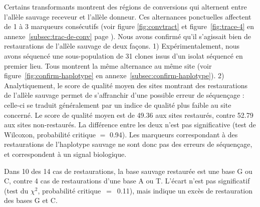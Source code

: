 Certains transformants montrent des régions de conversions qui alternent entre
l'allèle sauvage receveur et l'allèle donneur. Ces alternances ponctuelles
affectent de 1 à 3 marqueurs consécutifs (voir figure \ref{fig:convtract} et
figure~\ref{fig:trace-4} en annexe~\ref{subsec:trac-de-conv}
page \pageref{fig:trace-4}). Nous avons confirmé qu'il s'agissait bien de
restaurations de l'allèle sauvage de deux façons. 1) Expérimentalement, nous
avons séquencé une sous-population de \num{31} clones issus d'un isolat séquencé en
premier lieu. Tous montrent la même alternance au même site (voir
figure~\ref{fig:confirm-haplotype} en annexe~\ref{subsec:confirm-haplotype}). 2)
Analytiquement, le score de qualité moyen des sites montrant des restaurations
de l'allèle sauvage permet de s'affranchir d'une possible erreur de séquençage :
celle-ci se traduit généralement par un indice de qualité plus faible au site
concerné. Le score de qualité moyen est de \num{49.36} aux sites restaurés,
contre \num{52.79} aux sites non-restaurés. La différence entre les deux n'est
pas significative (test de Wilcoxon, probabilité critique \(=\) \num{0.94}). Les
marqueurs correspondant à des restaurations de l'haplotype sauvage ne sont donc
pas des erreurs de séquençage, et correspondent à un signal biologique.

Dans 10 des 14 cas de restaurations, la base sauvage restaurée est une base G ou
C, contre 4 cas de restaurations d'une base A ou T. L'écart n'est pas
significatif (test du $\chi^2$, probabilité critique~\(=\)~\num{0.11}), mais
indique un excès de restauration des bases G et C.




